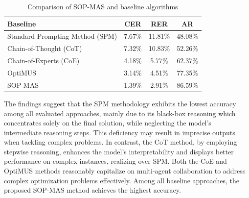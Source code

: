 \documentclass[preprint,12pt]{elsarticle}
\begin{document}
\begin{table}[t]%
\caption{Comparison of SOP-MAS and baseline algorithms}\label{tab:benchmark}

\centering%
\begin{tabular}{l c c c}
\hline
Baseline & CER & RER & AR \\
\hline
Standard Prompting Method (SPM) & 7.67\% & 11.81\% & 48.08\% \\
Chain-of-Thought (CoT) & 7.32\% & 10.83\% & 52.26\% \\
Chain-of-Experts (CoE) & 4.18\% & 5.77\% & 62.37\% \\
OptiMUS & 3.14\% & 4.51\% & 77.35\% \\
SOP-MAS & 1.39\% & 2.91\% & 86.59\% \\
\hline
\end{tabular}
\end{table}


The findings suggest that the SPM methodology exhibits the lowest accuracy among all evaluated approaches, mainly due to its black-box reasoning which concentrates solely on the final solution, while neglecting the model's intermediate reasoning steps. This deficiency may result in imprecise outputs when tackling complex problems. In contrast, the CoT method, by employing stepwise reasoning, enhances the model's interpretability and displays better performance on complex instances, realizing  over SPM. Both the CoE and OptiMUS methods reasonably capitalize on multi-agent collaboration to address complex optimization problems effectively. Among all baseline approaches, the proposed SOP-MAS method achieves the highest accuracy.
\end{document}

